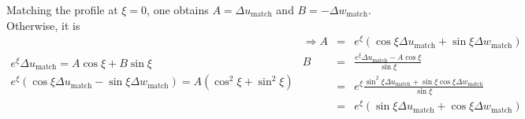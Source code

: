 \documentclass[a4paper,11pt]{amsart}
\newcommand{\gzm}{{\xi}}%
\begin{document}
Matching the profile at $\xi=0$, one obtains
$A = \Delta u_\text{match} $ and $B=-\Delta w_\text{match} $. Otherwise, it is
\begin{subequations} 
\begin{eqnarray}
  e^\gzm \Delta u_\text{match} = A \cos\gzm + B\sin\gzm \\
  e^\gzm (\cos\gzm \Delta u_\text{match} - \sin\gzm \Delta w_\text{match}) = A (\cos^2\gzm + \sin^2\gzm)
\end{eqnarray}
\begin{eqnarray}
  \Rightarrow A &=&e^\gzm (\cos\gzm\Delta u_\text{match} + \sin\gzm \Delta w_\text{match})\\
  B&=&  \frac{e^\gzm \Delta u_\text{match} - A \cos \gzm}{\sin\gzm} \\
  &=& e^\gzm \frac{ \sin^2\gzm \Delta u_\text{match}+\sin\xi\cos\xi \Delta w_\text{match} }{\sin\xi }  \\
  &=& e^\gzm (\sin\xi\Delta u_\text{match} + \cos\xi\Delta w_\text{match}) 
\end{eqnarray}
\end{subequations} 

\printbibliography 
\end{document}
